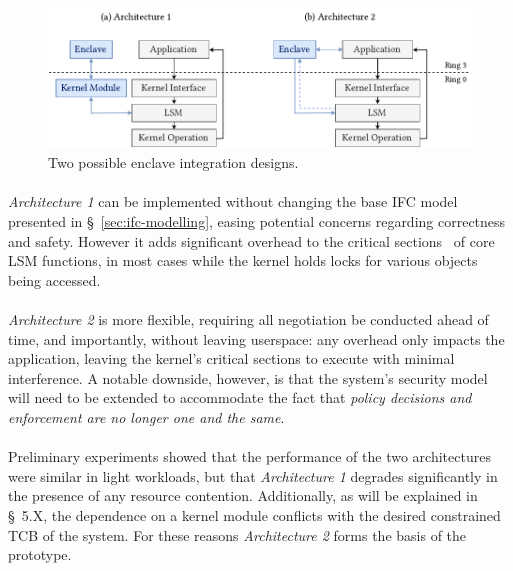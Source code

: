 \begin{figure}[]
    \centering
    \includegraphics[width=0.98\linewidth]{figures/SGX-EnclaveIntegration-Design}
    \caption{Two possible enclave integration designs.}
    \vspace{2mm}
    \label{fig:sgx-integration}
    \vspace{5mm}
\end{figure}

\paragraph{}\textit{Architecture 1} can be implemented without changing the base IFC model presented in §~\ref{sec:ifc-modelling}, easing potential concerns regarding correctness and safety. However it adds significant overhead to the critical sections~\cite{Dubois1988SynchronizationCA} of core LSM functions, in most cases while the kernel holds locks for various objects being accessed.

\paragraph{} \textit{Architecture 2} is more flexible, requiring all negotiation be conducted ahead of time, and importantly, without leaving userspace: any overhead only impacts the application, leaving the kernel's critical sections to execute with minimal interference. A notable downside, however, is that the system's security model will need to be extended to accommodate the fact that \textit{policy decisions and enforcement are no longer one and the same}.

\paragraph{} Preliminary experiments showed that the performance of the two architectures were similar in light workloads, but that \textit{Architecture 1} degrades significantly in the presence of any resource contention. Additionally, as will be explained in §~5.X, the dependence on a kernel module conflicts with the desired constrained TCB of the system. For these reasons \textit{Architecture 2} forms the basis of the prototype.

